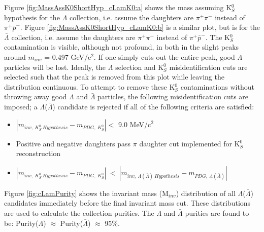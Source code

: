 \documentclass[../AnalysisNoteJBuxton.tex]{subfiles}
\begin{document}
Figure \ref{fig:MassAssK0ShortHyp_cLamK0:a} shows the mass assuming K$^{0}_{S}$ hypothesis for the $\Lambda$ collection, i.e. assume the daughters are $\pi^{+}\pi^{-}$ instead of $\pi^{+}\bar{p}^{-}$.
Figure \ref{fig:MassAssK0ShortHyp_cLamK0:b} is a similar plot, but is for the $\bar{\Lambda}$ collection, i.e. assume the daughters are $\pi^{+}\pi^{-}$ instead of $\pi^{+}\bar{p}^{-}$.
The K$^{0}_{S}$ contamination is visible, although not profound, in both in the slight peaks around $m_{inv}$ = 0.497 GeV/c$^{2}$.
If one simply cuts out the entire peak, good $\Lambda$ particles will be lost.
Ideally, the $\Lambda$ selection and K$^{0}_{S}$ misidentification cuts are selected such that the peak is removed from this plot while leaving the distribution continuous.
To attempt to remove these K$^{0}_{S}$ contaminations without throwing away good $\Lambda$ and $\bar{\Lambda}$ particles, the following misidentification cuts are imposed; a $\Lambda$($\bar{\Lambda}$) candidate is rejected if all of the following criteria are satisfied:
\begin{itemize}
 \item $\left|m_{inv,~ K^{0}_{S}~ Hypothesis} - m_{PDG,~ K^{0}_{S}}\right| < $ 9.0 MeV/c$^{2}$
 \item Positive and negative daughters pass $\pi$ daughter cut implemented for K$^{0}_{S}$ reconstruction
 \item $\left|m_{inv,~ K^{0}_{S}~ Hypothesis} - m_{PDG,~ K^{0}_{S}}\right|~ < ~\left|m_{inv,~ \Lambda(\bar{\Lambda})~ Hypothesis} - m_{PDG,~ \Lambda(\bar{\Lambda})}\right|$
\end{itemize} 


Figure \ref{fig:cLamPurity} shows the invariant mass (M$_{inv}$) distribution of all $\Lambda$($\bar{\Lambda}$) candidates immediately before the final invariant mass cut.
These distributions are used to calculate the collection purities.
The $\Lambda$ and $\bar{\Lambda}$ purities are found to be: Purity($\Lambda$) $\approx$ Purity($\bar{\Lambda}$) $\approx$ 95\%.
\end{document}
